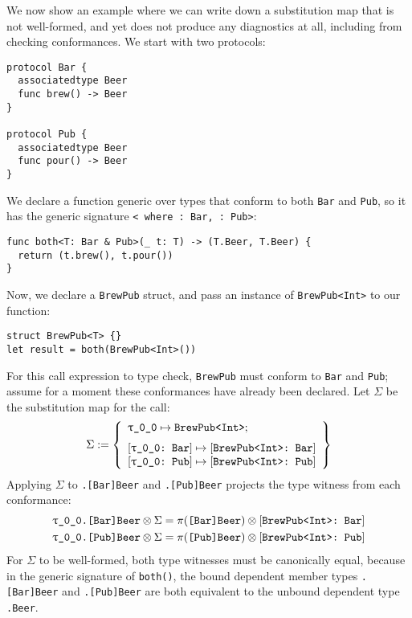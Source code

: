 \documentclass[../generics]{subfiles}
\begin{document}
We now show an example where we can write down a substitution map that is not well-formed, and yet  does not produce any diagnostics at all, including from checking conformances. We start with two protocols:
\begin{Verbatim}
protocol Bar {
  associatedtype Beer
  func brew() -> Beer
}

protocol Pub {
  associatedtype Beer
  func pour() -> Beer
}
\end{Verbatim}
We declare a function generic over types that conform to both \texttt{Bar} and \texttt{Pub}, so it has the generic signature \texttt{< where :~Bar, :~Pub>}:
\begin{Verbatim}
func both<T: Bar & Pub>(_ t: T) -> (T.Beer, T.Beer) {
  return (t.brew(), t.pour())
}
\end{Verbatim}
Now, we declare a \texttt{BrewPub} struct, and pass an instance of \texttt{BrewPub<Int>} to our function:
\begin{Verbatim}
struct BrewPub<T> {}
let result = both(BrewPub<Int>())
\end{Verbatim}
For this call expression to type check, \texttt{BrewPub} must conform to \texttt{Bar} and \texttt{Pub}; assume for a moment these conformances have already been declared. Let $\Sigma$ be the substitution map for the call:
\[
\Sigma := \SubstMapLongC{\SubstType{\ttgp{0}{0}}{BrewPub<Int>}}{
\SubstConf{\ttgp{0}{0}}{BrewPub<Int>}{Bar}\\
\SubstConf{\ttgp{0}{0}}{BrewPub<Int>}{Pub}
}
\]
Applying $\Sigma$ to \texttt{.[Bar]Beer} and \texttt{.[Pub]Beer} projects the type witness from each conformance:
\begin{gather*}
\texttt{\texttt{$\uptau$\_0\_0}.[Bar]Beer}\otimes\Sigma = \pi(\texttt{[Bar]Beer})\otimes[\texttt{BrewPub<Int>:~Bar}]\\
\texttt{\texttt{$\uptau$\_0\_0}.[Pub]Beer}\otimes\Sigma = \pi(\texttt{[Pub]Beer})\otimes[\texttt{BrewPub<Int>:~Pub}]
\end{gather*}
For $\Sigma$ to be well-formed, both type witnesses must be canonically equal, because in the generic signature of \texttt{both()}, the bound dependent member types \texttt{.[Bar]Beer} and \texttt{.[Pub]Beer} are both equivalent to the unbound dependent type \texttt{.Beer}.
\end{document}

